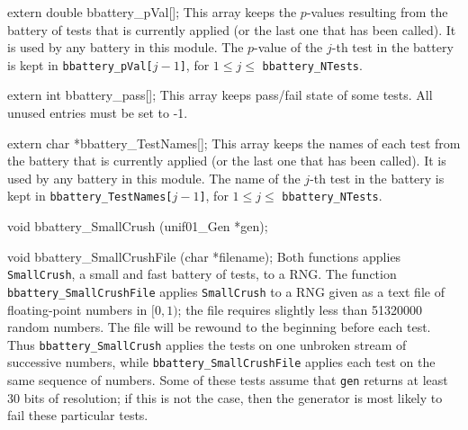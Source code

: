 extern double bbattery_pVal[];
\endcode
  \tab This array keeps the $p$-values resulting from the  battery of tests
  that is currently applied (or the last one that has been called). It is
  used by any battery in this module. The $p$-value of the $j$-th test in
  the battery is kept in {\tt bbattery\_pVal[$j-1$]}, for $1\le j\le $
  {\tt bbattery\_NTests}.
 \endtab
\code

extern int bbattery_pass[];
\endcode
  \tab This array keeps pass/fail state of some tests. All unused entries must be set to -1.
 \endtab

\code
extern char *bbattery_TestNames[];
\endcode
  \tab This array keeps the names of each test from  the
  battery that is currently applied (or the last one that has
  been called). It is used by any battery in this module.
  The name of the $j$-th test in the battery is
   kept in {\tt bbattery\_TestNames[$j-1$]},
  for $1\le j\le $ {\tt bbattery\_NTests}.
 \endtab



\code

void bbattery_SmallCrush (unif01_Gen *gen);

void bbattery_SmallCrushFile (char *filename);
\endcode
  \tab  Both functions applies {\tt SmallCrush}, a small and fast battery
   of tests, to a RNG. The function {\tt bbattery\_Small\-CrushFile} applies
  {\tt SmallCrush} to a RNG given as a text file of floating-point numbers in
  $[0, 1)$; the file requires slightly less than 51320000 random numbers.
   \label{bat:SmallCrush}
   The file will be rewound to the beginning before each test.
  Thus  {\tt bbattery\_SmallCrush} applies the tests on one unbroken
  stream of successive numbers, while {\tt bbattery\_Small\-CrushFile}
  applies each test on the same sequence of numbers.
  Some of these tests assume that {\tt gen} returns at least 30 bits of
  resolution; if this is not the case, then the generator is most likely to
  fail these particular tests.

